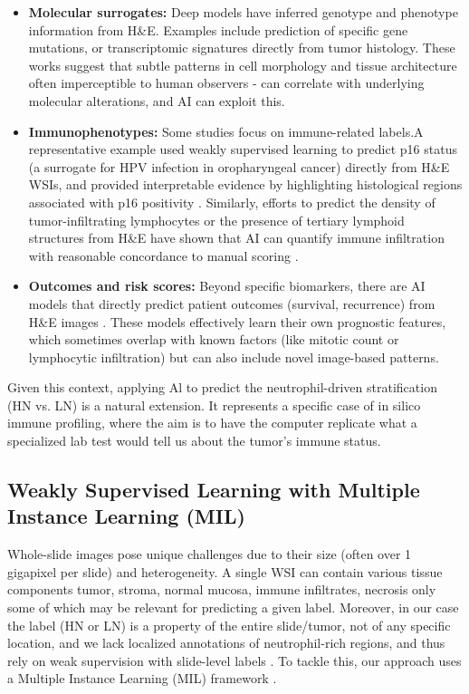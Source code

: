 \begin{itemize}
    \item \textbf{Molecular surrogates:} Deep models have inferred genotype and phenotype information from H\&E. Examples include prediction of specific gene mutations, or transcriptomic signatures directly from tumor histology. These works suggest that subtle patterns in cell morphology and tissue architecture often imperceptible to human observers - can correlate with underlying molecular alterations, and AI can exploit this.
    
    \item \textbf{Immunophenotypes:} Some studies focus on immune-related labels.A representative example used weakly supervised learning to predict p16 status (a surrogate for HPV infection in oropharyngeal cancer) directly from H\&E WSIs, and provided interpretable evidence by highlighting histological regions associated with p16 positivity \cite{adachi}. Similarly, efforts to predict the density of tumor-infiltrating lymphocytes or the presence of tertiary lymphoid structures from H\&E have shown that AI can quantify immune infiltration with reasonable concordance to manual scoring \cite{manzo2022, nomenclature}.
    
    \item \textbf{Outcomes and risk scores:} Beyond specific biomarkers, there are AI models that directly predict patient outcomes (survival, recurrence) from H\&E images \cite{pawlik2025}. These models effectively learn their own prognostic features, which sometimes overlap with known factors (like mitotic count or lymphocytic infiltration) but can also include novel image-based patterns.
\end{itemize}

Given this context, applying Al to predict the neutrophil-driven stratification (HN vs. LN) is a natural extension. It represents a specific case of in silico immune profiling, where the aim is to have the computer replicate what a specialized lab test would tell us about the tumor's immune status.

\subsection{Weakly Supervised Learning with Multiple Instance Learning (MIL)}
\label{sec:MIL}
Whole-slide images pose unique challenges due to their size (often over 1 gigapixel per slide) and heterogeneity. A single WSI can contain various tissue components tumor, stroma, normal mucosa, immune infiltrates, necrosis only some of which may be relevant for predicting a given label. Moreover, in our case the label (HN or LN) is a property of the entire slide/tumor, not of any specific location, and we lack localized annotations of neutrophil-rich regions, and thus rely on weak supervision with slide-level labels \cite{campanella2019}. To tackle this, our approach uses a Multiple Instance Learning (MIL) framework \cite{Lu,campanella2019}.

